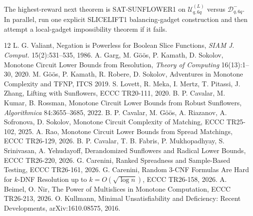 \documentclass[11pt]{article}
\begin{document}
The highest-reward next theorem is SAT-SUNFLOWER1 on \(\mathcal U^{(L)}_{q,6q}\) versus \(\mathcal D^-_{q,6q}\). In parallel, run one explicit SLICELIFT1 balancing-gadget construction and then attempt a local-gadget impossibility theorem if it fails.

\begin{thebibliography}{12}
 L. G. Valiant, Negation is Powerless for Boolean Slice Functions, \emph{SIAM J. Comput.} 15(2):531--535, 1986.
 A. Garg, M. G\"o\"os, P. Kamath, D. Sokolov, Monotone Circuit Lower Bounds from Resolution, \emph{Theory of Computing} 16(13):1--30, 2020.
 M. G\"o\"os, P. Kamath, R. Robere, D. Sokolov, Adventures in Monotone Complexity and TFNP, ITCS 2019.
 S. Lovett, R. Meka, I. Mertz, T. Pitassi, J. Zhang, Lifting with Sunflowers, ECCC TR20-111, 2020.
 B. P. Cavalar, M. Kumar, B. Rossman, Monotone Circuit Lower Bounds from Robust Sunflowers, \emph{Algorithmica} 84:3655--3685, 2022.
 B. P. Cavalar, M. G\"o\"os, A. Riazanov, A. Sofronova, D. Sokolov, Monotone Circuit Complexity of Matching, ECCC TR25-102, 2025.
 A. Rao, Monotone Circuit Lower Bounds from Spread Matchings, ECCC TR26-129, 2026.
 B. P. Cavalar, T. B. Fabris, P. Mukhopadhyay, S. Srinivasan, A. Yehudayoff, Derandomized Sunflowers and Radical Lower Bounds, ECCC TR26-220, 2026.
 G. Carenini, Ranked Spreadness and Sample-Based Testing, ECCC TR26-161, 2026.
 G. Carenini, Random 3-CNF Formulas Are Hard for \(k\)-DNF Resolution up to \(k=O(\sqrt{\log n})\), ECCC TR26-158, 2026.
 A. Beimel, O. Nir, The Power of Multislices in Monotone Computation, ECCC TR26-213, 2026.
 O. Kullmann, Minimal Unsatisfiability and Deficiency: Recent Developments, arXiv:1610.08575, 2016.
\end{thebibliography}
\end{document}
